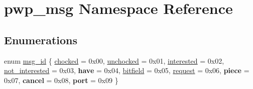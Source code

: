 \hypertarget{namespacepwp__msg}{}\section{pwp\+\_\+msg Namespace Reference}
\label{namespacepwp__msg}
\subsection*{Enumerations}
\begin{DoxyCompactItemize}
\item 
enum \hyperlink{namespacepwp__msg_a0b9a29508f00a30e5138d2b78f4b1daf}{msg\+\_\+id} \{ \newline
\hyperlink{namespacepwp__msg_a0b9a29508f00a30e5138d2b78f4b1dafae1d8b3754d66ec7fcad827fb54eaeea2}{chocked} = 0x00, 
\hyperlink{namespacepwp__msg_a0b9a29508f00a30e5138d2b78f4b1dafa55689e288bf71e7737faaf385b1c528b}{unchocked} = 0x01, 
\hyperlink{namespacepwp__msg_a0b9a29508f00a30e5138d2b78f4b1dafaa20400a601bcf2b8d752b26376b2b904}{interested} = 0x02, 
\hyperlink{namespacepwp__msg_a0b9a29508f00a30e5138d2b78f4b1dafa3150be15265845a6442c6ecd1515ecec}{not\+\_\+interested} = 0x03, 
\newline
{\bfseries have} = 0x04, 
\hyperlink{namespacepwp__msg_a0b9a29508f00a30e5138d2b78f4b1dafac3a2343a7b67a371e241ae2184bfe9cd}{bitfield} = 0x05, 
\hyperlink{namespacepwp__msg_a0b9a29508f00a30e5138d2b78f4b1dafa4d6478c4fe948a9f3aa3ce8d09974370}{request} = 0x06, 
{\bfseries piece} = 0x07, 
\newline
{\bfseries cancel} = 0x08, 
{\bfseries port} = 0x09
 \}
\end{DoxyCompactItemize}
